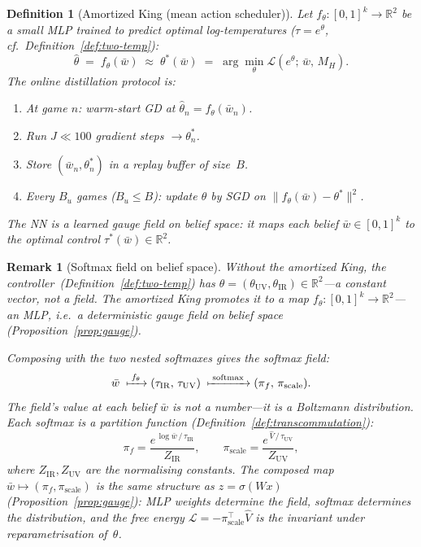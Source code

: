 \documentclass[11pt,a4paper]{article}
\newtheorem{definition}[theorem]{Definition}
\newtheorem{remark}[theorem]{Remark}
\newcommand{\R}{\mathbb{R}}
\newcommand{\cL}{\mathcal{L}}
\newcommand{\softmax}{\mathrm{softmax}}
\begin{document}
\begin{definition}[Amortized King (mean action scheduler)]%
\label{def:amortized-king}
\color{black!60}%
Let $f_\theta\colon [0,1]^k \to \R^2$ be a small MLP
trained to predict optimal log-temperatures
($\tau = e^\theta$, cf.\ Definition~\ref{def:two-temp}):
\[
  \hat{\theta} \;=\; f_\theta(\bar{w})
  \;\approx\; \theta^*(\bar{w})
  \;=\; \arg\min_\theta \cL(e^\theta;\, \bar{w},\, M_H).
\]
The \emph{online distillation protocol} is:
\begin{enumerate}[label=\textup{(\roman*)}, nosep]
\item At game $n$: warm-start GD at
  $\hat{\theta}_n = f_\theta(\bar{w}_n)$.
\item Run $J \ll 100$ gradient steps $\to \theta^*_n$.
\item Store $(\bar{w}_n, \theta^*_n)$ in a replay buffer
  of size~$B$.
\item Every $B_u$ games ($B_u \leq B$): update $\theta$
  by SGD on
  $\|f_\theta(\bar{w}) - \theta^*\|^2$.
\end{enumerate}
The NN is a \emph{learned gauge field on belief space}:
it maps each belief $\bar{w} \in [0,1]^k$ to the
optimal control $\tau^*(\bar{w}) \in \R^2$.
\end{definition}

\begin{remark}[Softmax field on belief space]%
\label{rem:softmax-field}
\color{black!60}%
Without the amortized King,
the controller~(Definition~\ref{def:two-temp})
has $\theta = (\theta_{\mathrm{UV}}, \theta_{\mathrm{IR}})
\in \R^2$---a constant vector, not a field.
The amortized King promotes it to a map
$f_\theta \colon [0,1]^k \to \R^2$---an MLP,
i.e.\ a deterministic gauge field on belief space
(Proposition~\ref{prop:gauge}).

Composing with the two nested softmaxes gives the
\emph{softmax field}:
\[
  \bar{w}
  \;\xmapsto{\;f_\theta\;}
  (\tau_{\mathrm{IR}},\, \tau_{\mathrm{UV}})
  \;\xmapsto{\;\softmax\;}
  (\pi_f,\, \pi_{\mathrm{scale}}).
\]
The field's value at each belief $\bar{w}$ is not
a number---it is a \emph{Boltzmann distribution}.
Each softmax is a partition function
(Definition~\ref{def:transcommutation}):
\[
  \pi_f
  = \frac{e^{\,\log \bar{w}\,/\,\tau_{\mathrm{IR}}}}
         {Z_{\mathrm{IR}}},
  \qquad
  \pi_{\mathrm{scale}}
  = \frac{e^{\,\hat{V}\,/\,\tau_{\mathrm{UV}}}}
         {Z_{\mathrm{UV}}},
\]
where $Z_{\mathrm{IR}}, Z_{\mathrm{UV}}$ are the
normalising constants.
The composed map
$\bar{w} \mapsto (\pi_f, \pi_{\mathrm{scale}})$
is the same structure as $z = \sigma(Wx)$
(Proposition~\ref{prop:gauge}):
MLP weights determine the field,
softmax determines the distribution,
and the free energy
$\cL = -\pi_{\mathrm{scale}}^\top \hat{V}$
is the invariant under reparametrisation of~$\theta$.
\end{remark}
\end{document}
